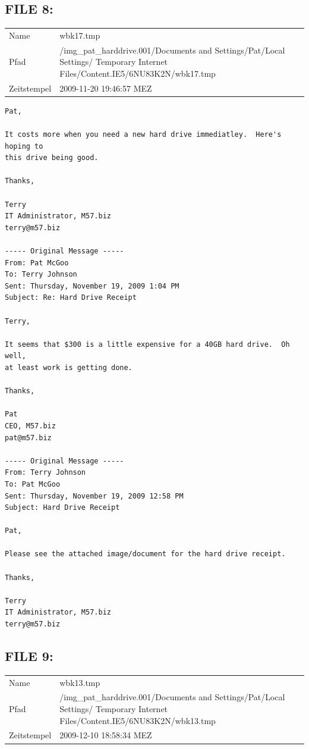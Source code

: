 \subsection{FILE 8:}
\label{sec:pat_emails_8}

\begin{table}[htb]
	\begin{tabular}{p{2cm} p{13.5cm}}
		Name & wbk17.tmp\\
		Pfad & /img_pat_harddrive.001/Documents and Settings/Pat/Local Settings/ Temporary Internet Files/Content.IE5/6NU83K2N/wbk17.tmp\\
		Zeitstempel & 2009-11-20 19:46:57 MEZ
	\end{tabular}
\end{table}		

\begin{lstlisting}
Pat,

It costs more when you need a new hard drive immediatley.  Here's hoping to 
this drive being good.

Thanks,

Terry
IT Administrator, M57.biz
terry@m57.biz

----- Original Message -----
From: Pat McGoo
To: Terry Johnson
Sent: Thursday, November 19, 2009 1:04 PM
Subject: Re: Hard Drive Receipt

Terry,

It seems that $300 is a little expensive for a 40GB hard drive.  Oh well,
at least work is getting done.

Thanks,

Pat
CEO, M57.biz
pat@m57.biz

----- Original Message -----
From: Terry Johnson
To: Pat McGoo
Sent: Thursday, November 19, 2009 12:58 PM
Subject: Hard Drive Receipt

Pat,

Please see the attached image/document for the hard drive receipt.

Thanks,

Terry
IT Administrator, M57.biz
terry@m57.biz

\end{lstlisting}

\subsection{FILE 9:}
\label{sec:pat_emails_9}	

\begin{table}[htb]
	\begin{tabular}{p{2cm} p{13.5cm}}
		Name & wbk13.tmp\\
		Pfad & /img_pat_harddrive.001/Documents and Settings/Pat/Local Settings/ Temporary Internet Files/Content.IE5/6NU83K2N/wbk13.tmp\\
		Zeitstempel & 2009-12-10 18:58:34 MEZ
	\end{tabular}
\end{table}	

